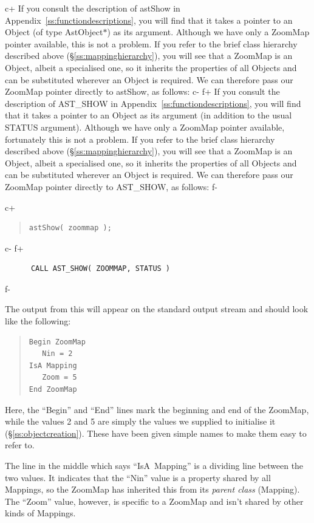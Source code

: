 \documentclass[twoside,11pt]{article}
\newcommand{\appref}[1]{Appendix~\ref{#1}}
\newcommand{\secref}[1]{\S\ref{#1}}
\newcommand{\appref}[1]{\ref{#1}}
\newcommand{\secref}[1]{\ref{#1}}
\begin{document}
c+
If you consult the description of astShow in
\appref{ss:functiondescriptions}, you will find that it takes a
pointer to an Object (of type AstObject$*$) as its argument. Although
we have only a ZoomMap pointer available, this is not a problem. If
you refer to the brief class hierarchy described above
(\secref{ss:mappinghierarchy}), you will see that a ZoomMap is an
Object, albeit a specialised one, so it inherits the properties of all
Objects and can be substituted wherever an Object is required.  We can
therefore pass our ZoomMap pointer directly to astShow, as follows:
c-
f+
If you consult the description of AST\_SHOW in
\appref{ss:functiondescriptions}, you will find that it takes a
pointer to an Object as its argument (in addition to the usual STATUS
argument). Although we have only a ZoomMap pointer available,
fortunately this is not a problem. If you refer to the brief class
hierarchy described above (\secref{ss:mappinghierarchy}), you will see
that a ZoomMap is an Object, albeit a specialised one, so it inherits
the properties of all Objects and can be substituted wherever an
Object is required.  We can therefore pass our ZoomMap pointer
directly to AST\_SHOW, as follows:
f-

c+
\begin{quote}
\small
\begin{verbatim}
astShow( zoommap );
\end{verbatim}
\normalsize
\end{quote}
c-
f+
\small
\begin{verbatim}
      CALL AST_SHOW( ZOOMMAP, STATUS )
\end{verbatim}
\normalsize
f-

The output from this will appear on the standard output stream and
should look like the following:

\begin{quote}
\small
\begin{verbatim}
Begin ZoomMap
   Nin = 2
IsA Mapping
   Zoom = 5
End ZoomMap
\end{verbatim}
\normalsize
\end{quote}

Here, the ``Begin'' and ``End'' lines mark the beginning and end of
the ZoomMap, while the values 2 and 5 are simply the values we
supplied to initialise it (\secref{ss:objectcreation}). These have
been given simple names to make them easy to refer to.

The line in the middle which says ``IsA~Mapping'' is a dividing line
between the two values. It indicates that the ``Nin'' value is a
property shared by all Mappings, so the ZoomMap has inherited this
from its {\em{parent class}} (Mapping). The ``Zoom'' value, however,
is specific to a ZoomMap and isn't shared by other kinds of Mappings.
\end{document}
